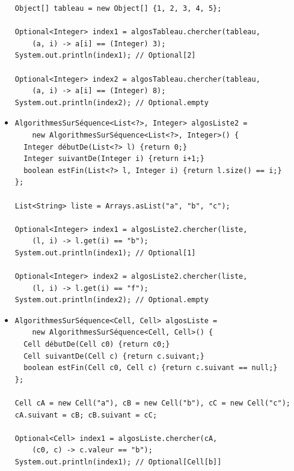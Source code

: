 \documentclass[draft]{beamer}
\DeclareRobustCommand{\todo}[1]{\ifdraft{\textbf{\textcolor{red}{[#1]}}}{}}
\begin{document}
\begin{frame}
\begin{itemize}
\begin{lstlisting}
Object[] tableau = new Object[] {1, 2, 3, 4, 5};

Optional<Integer> index1 = algosTableau.chercher(tableau,
    (a, i) -> a[i] == (Integer) 3);
System.out.println(index1); // Optional[2]

Optional<Integer> index2 = algosTableau.chercher(tableau,
    (a, i) -> a[i] == (Integer) 8);
System.out.println(index2); // Optional.empty
 \end{lstlisting}
 \newpage
 \item \todo{Implementation for \lstinline{List}:}
 \begin{lstlisting}
AlgorithmesSurSéquence<List<?>, Integer> algosListe2 =
    new AlgorithmesSurSéquence<List<?>, Integer>() {
  Integer débutDe(List<?> l) {return 0;}
  Integer suivantDe(Integer i) {return i+1;}
  boolean estFin(List<?> l, Integer i) {return l.size() == i;}
};

List<String> liste = Arrays.asList("a", "b", "c");

Optional<Integer> index1 = algosListe2.chercher(liste,
    (l, i) -> l.get(i) == "b");
System.out.println(index1); // Optional[1]

Optional<Integer> index2 = algosListe2.chercher(liste,
    (l, i) -> l.get(i) == "f");
System.out.println(index2); // Optional.empty
 \end{lstlisting}
 \newpage
 \item \todo{Implementation for custom linked list:}
 \begin{lstlisting}
AlgorithmesSurSéquence<Cell, Cell> algosListe =
    new AlgorithmesSurSéquence<Cell, Cell>() {
  Cell débutDe(Cell c0) {return c0;}
  Cell suivantDe(Cell c) {return c.suivant;}
  boolean estFin(Cell c0, Cell c) {return c.suivant == null;}
};

Cell cA = new Cell("a"), cB = new Cell("b"), cC = new Cell("c");
cA.suivant = cB; cB.suivant = cC;

Optional<Cell> index1 = algosListe.chercher(cA,
    (c0, c) -> c.valeur == "b");
System.out.println(index1); // Optional[Cell[b]]


\end{lstlisting}
\end{itemize}
\end{frame}
\end{document}
